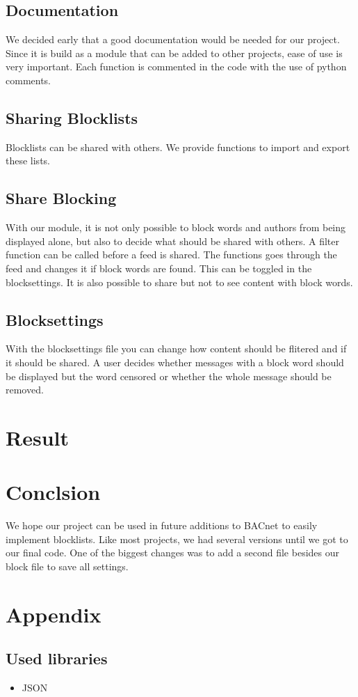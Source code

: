 \documentclass[12pt]{report}
\begin{document}
\subsection{Documentation}
We decided early that a good documentation would be needed for our project.
Since it is build as a module that can be added to other projects, ease of use is very important.
Each function is commented in the code with the use of python comments. 

\subsection{Sharing Blocklists}
Blocklists can be shared with others. 
We provide functions to import and export these lists.

\subsection{Share Blocking}
With our module, it is not only possible to block words and authors from being displayed alone, but also to decide what should be shared with others.
A filter function can be called before a feed is shared. The functions goes through the feed and changes it if block words are found.
This can be toggled in the blocksettings.
It is also possible to share but not to see content with block words.

\subsection{Blocksettings}
With the blocksettings file you can change how content should be flitered and if it should be shared.
A user decides whether messages with a block word should be displayed but the word censored or whether the whole message should be removed.




\section{Result}






\section{Conclsion}
We hope our project can be used in future additions to BACnet to easily implement blocklists.
Like most projects, we had several versions until we got to our final code.
One of the biggest changes was to add a second file besides our block file to save all settings.


\section{Appendix}
\subsection{Used libraries}
\begin{itemize}
  \item JSON
\end{itemize}
\end{document}
